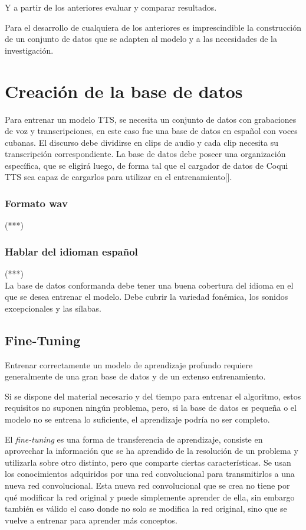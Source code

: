 Y a partir de los anteriores evaluar y comparar resultados.

Para el desarrollo de cualquiera de los anteriores es imprescindible la construcción de un conjunto de datos que se adapten al modelo y a las necesidades de la investigación.


\section{Creación de la base de datos}

Para entrenar un modelo TTS, se necesita un conjunto de datos con grabaciones de voz y transcripciones, en este caso fue una base de datos en español con voces cubanas. El discurso debe dividirse en clips de audio y cada clip necesita su transcripción correspondiente. La base de datos debe poseer una organización específica, que se eligirá luego, de forma tal que el cargador de datos de Coqui TTS sea capaz de cargarlos para utilizar en el entrenamiento[\cite{formatting-dataset}].    

\subsubsection{Formato wav}
(***)



\subsubsection{Hablar del idioman español}
(***)\\


La base de datos conformanda debe tener una buena cobertura del idioma en el que se desea entrenar el modelo. Debe cubrir la variedad fonémica, los sonidos excepcionales y las sílabas. 

\subsection*{Fine-Tuning}
Entrenar correctamente un modelo de aprendizaje profundo requiere generalmente de una gran base de datos y de un extenso entrenamiento.

Si se dispone del material necesario y del tiempo para entrenar el algoritmo, estos requisitos no suponen ningún problema, pero, si la base de datos es pequeña o el modelo no se entrena lo suficiente, el aprendizaje podría no ser completo.

El \textit{fine-tuning} es una forma de transferencia de aprendizaje, consiste en aprovechar la información que se ha aprendido de
la resolución de un problema y utilizarla sobre otro distinto, pero que comparte ciertas características. Se usan los conocimientos adquiridos por una red convolucional para transmitirlos a una nueva red convolucional. Esta nueva red convolucional que se crea no tiene por qué modificar la red original y puede simplemente aprender de ella, sin embargo también es válido el caso donde no solo se modifica la red original, sino que se vuelve a entrenar para aprender más conceptos.

